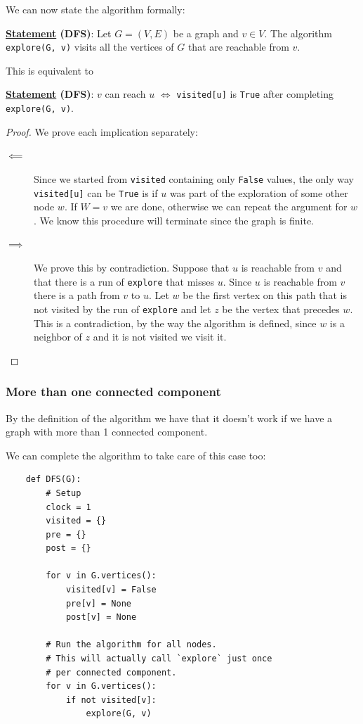 \documentclass[12pt]{extarticle}
\begin{document}
We can now state the algorithm formally:

\textbf{\underline{Statement} (DFS)}: Let $G = (V, E)$ be a graph and $v \in V$.
The algorithm \texttt{explore(G, v)} visits all the vertices of $G$ that are reachable from $v$.

This is equivalent to

\textbf{\underline{Statement} (DFS)}: $v$ can reach $u$ $\iff$ \texttt{visited[u]} is \texttt{True} after completing \texttt{explore(G, v)}.

\begin{proof}
    We prove each implication separately:

    \begin{description}
        \item[$\impliedby$] Since we started from \texttt{visited} containing only \texttt{False} values,
              the only way \texttt{visited[u]} can be \texttt{True} is if $u$ was part of the exploration of some other node $w$.
              If $W = v$ we are done, otherwise we can repeat the argument for $w$.
              We know this procedure will terminate since the graph is finite.
        \item[$\implies$] We prove this by contradiction.
              Suppose that $u$ is reachable from $v$ and that there is a run of \texttt{explore} that misses $u$.
              Since $u$ is reachable from $v$ there is a path from $v$ to $u$.
              Let $w$ be the first vertex on this path that is not visited by the run of \texttt{explore} and let $z$ be the vertex that precedes $w$.
              This is a contradiction, by the way the algorithm is defined, since $w$ is a neighbor of $z$ and it is not visited we visit it.
    \end{description}
\end{proof}

\subsubsection{More than one connected component}

By the definition of the algorithm we have that it doesn't work if we have a graph with more than 1 connected component.

We can complete the algorithm to take care of this case too:

\begin{verbatim}
    def DFS(G):
        # Setup
        clock = 1
        visited = {}
        pre = {}
        post = {}

        for v in G.vertices():
            visited[v] = False
            pre[v] = None
            post[v] = None

        # Run the algorithm for all nodes.
        # This will actually call `explore` just once
        # per connected component.
        for v in G.vertices():
            if not visited[v]:
                explore(G, v)

\end{verbatim}
\end{document}
